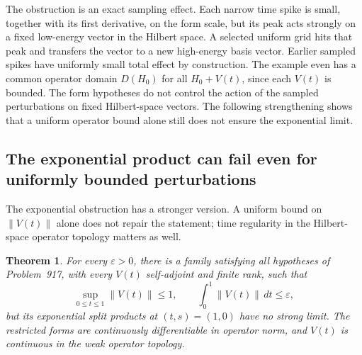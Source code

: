 \documentclass[11pt,a4paper]{article}
\newtheorem{theorem}{Theorem}[section]
\theoremstyle{remark}
\begin{document}
The obstruction is an exact sampling effect. Each narrow time spike is
small, together with its
first derivative, on the form scale, but its peak acts strongly on a
fixed low-energy vector in the Hilbert space. A selected uniform grid
hits that peak and transfers the vector to a new high-energy basis
vector. Earlier sampled spikes have uniformly small total effect by
construction. The example even has a common operator domain
$D(H_0)$ for all $H_0+V(t)$, since each $V(t)$ is bounded. The form
hypotheses do not control the action of the sampled perturbations on
fixed Hilbert-space vectors. The following strengthening shows that a
uniform operator bound alone still does not ensure the exponential
limit.

\subsection{The exponential product can fail even for uniformly bounded perturbations}
\label{sec:917bounded}

The exponential obstruction has a stronger version. A uniform bound on
$\|V(t)\|$ alone does not repair the statement; time regularity in the
Hilbert-space operator topology matters as well.

\begin{theorem}\label{thm:917bounded}
For every $\varepsilon>0$, there is a family satisfying all hypotheses of
Problem~917, with every $V(t)$ self-adjoint and finite rank, such that
\[
 \sup_{0\le t\le1}\|V(t)\|\le1,
 \qquad \int_0^1\|V(t)\|\,dt\le\varepsilon,
\]
but its exponential split products at $(t,s)=(1,0)$ have no strong limit.
The restricted forms are continuously differentiable in operator norm,
and $V(t)$ is continuous in the weak operator topology.
\end{theorem}
\end{document}
